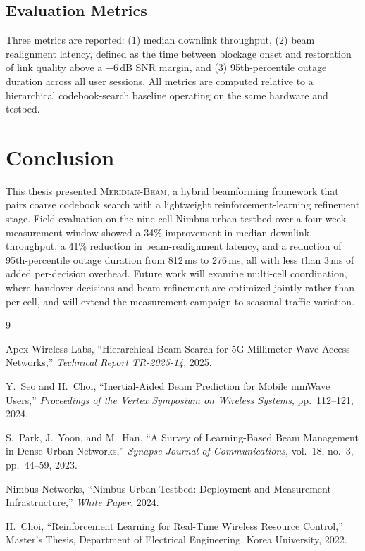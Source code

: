 \documentclass[12pt,a4paper]{report}
\begin{document}
\section{Evaluation Metrics}
Three metrics are reported: (1) median downlink throughput, (2) beam
realignment latency, defined as the time between blockage onset and
restoration of link quality above a $-6$\,dB SNR margin, and (3)
95th-percentile outage duration across all user sessions. All metrics are
computed relative to a hierarchical codebook-search baseline operating on the
same hardware and testbed.

\chapter{Conclusion}
\label{ch:conclusion}

This thesis presented \textsc{Meridian-Beam}, a hybrid beamforming framework
that pairs coarse codebook search with a lightweight reinforcement-learning
refinement stage. Field evaluation on the nine-cell Nimbus urban testbed over
a four-week measurement window showed a 34\% improvement in median downlink
throughput, a 41\% reduction in beam-realignment latency, and a reduction of
95th-percentile outage duration from 812\,ms to 276\,ms, all with less than
3\,ms of added per-decision overhead. Future work will examine multi-cell
coordination, where handover decisions and beam refinement are optimized
jointly rather than per cell, and will extend the measurement campaign to
seasonal traffic variation.

\clearpage
\begin{thebibliography}{9}
\small

Apex Wireless Labs, ``Hierarchical Beam Search for 5G Millimeter-Wave
Access Networks,'' \textit{Technical Report TR-2025-14}, 2025.

Y.~Seo and H.~Choi, ``Inertial-Aided Beam Prediction for Mobile mmWave
Users,'' \textit{Proceedings of the Vertex Symposium on Wireless Systems},
pp.~112--121, 2024.

S.~Park, J.~Yoon, and M.~Han, ``A Survey of Learning-Based Beam Management
in Dense Urban Networks,'' \textit{Synapse Journal of Communications},
vol.~18, no.~3, pp.~44--59, 2023.

Nimbus Networks, ``Nimbus Urban Testbed: Deployment and Measurement
Infrastructure,'' \textit{White Paper}, 2024.

H.~Choi, ``Reinforcement Learning for Real-Time Wireless Resource
Control,'' Master's Thesis, Department of Electrical Engineering, Korea
University, 2022.

\end{thebibliography}
\end{document}
